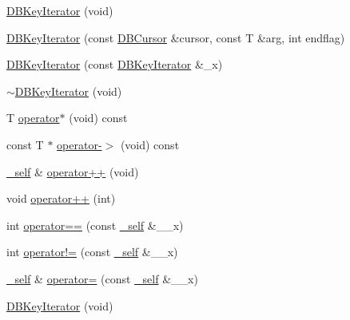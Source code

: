 \begin{DoxyCompactItemize}
\item 
\mbox{\hyperlink{classFILEDB_1_1DBKeyIterator_aece085c0a59d87759e01613b5c64ef36}{D\+B\+Key\+Iterator}} (void)
\item 
\mbox{\hyperlink{classFILEDB_1_1DBKeyIterator_a7dc82bdde4a77bcadd704a3e87f6534a}{D\+B\+Key\+Iterator}} (const \mbox{\hyperlink{classFILEDB_1_1DBCursor}{D\+B\+Cursor}} \&cursor, const T \&arg, int endflag)
\item 
\mbox{\hyperlink{classFILEDB_1_1DBKeyIterator_ac1fa531110379c3deb566758095e8a0e}{D\+B\+Key\+Iterator}} (const \mbox{\hyperlink{classFILEDB_1_1DBKeyIterator}{D\+B\+Key\+Iterator}} \&\+\_\+x)
\item 
\mbox{\hyperlink{classFILEDB_1_1DBKeyIterator_a54300ef8000ed2910c47d931ee091113}{$\sim$\+D\+B\+Key\+Iterator}} (void)
\item 
T \mbox{\hyperlink{classFILEDB_1_1DBKeyIterator_ab3cfba3f2b19b6eb74ff614c62195ab4}{operator$\ast$}} (void) const
\item 
const T $\ast$ \mbox{\hyperlink{classFILEDB_1_1DBKeyIterator_a453e5281ba078f217558d44c049c564c}{operator-\/$>$}} (void) const
\item 
\mbox{\hyperlink{classFILEDB_1_1DBKeyIterator_aaf7773c7a848ec6e04bc738dd794ace1}{\+\_\+self}} \& \mbox{\hyperlink{classFILEDB_1_1DBKeyIterator_a7816155cac741f3f82dafa73028f4307}{operator++}} (void)
\item 
void \mbox{\hyperlink{classFILEDB_1_1DBKeyIterator_a364ac0414da6888e0b981f07b3239257}{operator++}} (int)
\item 
int \mbox{\hyperlink{classFILEDB_1_1DBKeyIterator_ab6d1aad1d07c4ee9a1edeadf6610c6f4}{operator==}} (const \mbox{\hyperlink{classFILEDB_1_1DBKeyIterator_aaf7773c7a848ec6e04bc738dd794ace1}{\+\_\+self}} \&\+\_\+\+\_\+x)
\item 
int \mbox{\hyperlink{classFILEDB_1_1DBKeyIterator_aa92d51bde395e8c546d9cbe1c65ef5e1}{operator!=}} (const \mbox{\hyperlink{classFILEDB_1_1DBKeyIterator_aaf7773c7a848ec6e04bc738dd794ace1}{\+\_\+self}} \&\+\_\+\+\_\+x)
\item 
\mbox{\hyperlink{classFILEDB_1_1DBKeyIterator_aaf7773c7a848ec6e04bc738dd794ace1}{\+\_\+self}} \& \mbox{\hyperlink{classFILEDB_1_1DBKeyIterator_adfa49c128d637dae0263553529126575}{operator=}} (const \mbox{\hyperlink{classFILEDB_1_1DBKeyIterator_aaf7773c7a848ec6e04bc738dd794ace1}{\+\_\+self}} \&\+\_\+\+\_\+x)
\item 
\mbox{\hyperlink{classFILEDB_1_1DBKeyIterator_aece085c0a59d87759e01613b5c64ef36}{D\+B\+Key\+Iterator}} (void)
\item 

\end{DoxyCompactItemize}
